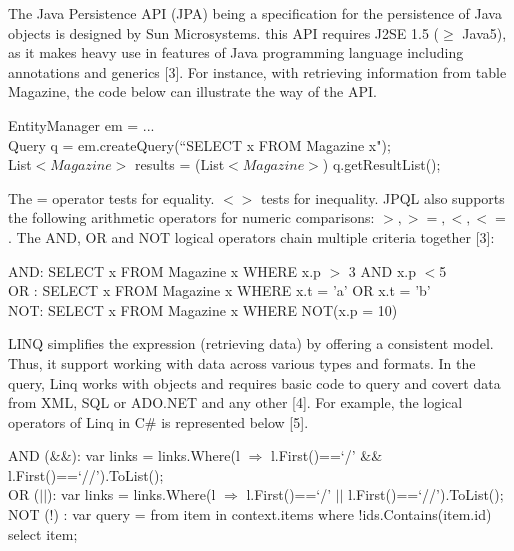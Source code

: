 \documentclass[10pt]{report}
\begin{document}
 
The Java Persistence API (JPA) being a specification for the persistence of Java objects is designed by Sun Microsystems. this API requires J2SE 1.5 ($\geqslant$ Java5), as it makes heavy use in features of Java programming language including annotations and generics [3]. For instance, with retrieving information from table Magazine, the code below can illustrate the way of the API.

\noindent
EntityManager em = ...\\
Query q = em.createQuery(``SELECT x FROM Magazine x");\\
List$<Magazine>$ results = (List$<Magazine>$) q.getResultList();

The = operator tests for equality. $<>$ tests for inequality. JPQL also supports the following arithmetic operators for numeric 
comparisons: $>, >=, <, <=$.
The AND, OR and NOT logical operators chain multiple criteria together [3]:

\noindent
AND: SELECT x FROM Magazine x WHERE x.p $>$ 3 AND x.p $<$5 \\
OR : SELECT x FROM Magazine x WHERE x.t = 'a' OR x.t = 'b'\\
NOT: SELECT x FROM Magazine x WHERE NOT(x.p = 10)

LINQ simplifies the expression (retrieving data) by offering a consistent model. Thus, it support working with data across various types and formats. In the query, Linq works with objects and requires basic code to query and covert data from XML, SQL or ADO.NET and any other [4]. For example, the logical operators of Linq in C\# is represented below [5].

\noindent
AND (\&\&): var links = links.Where(l $\Rightarrow$ l.First()==`/' \&\& l.First()==`//').ToList();\\
OR ($||$): var links = links.Where(l $\Rightarrow$ l.First()==`/' $||$ l.First()==`//').ToList(); \\
NOT (!) : var query = from item in context.items where !ids.Contains(item.id) select item;
\end{document}

